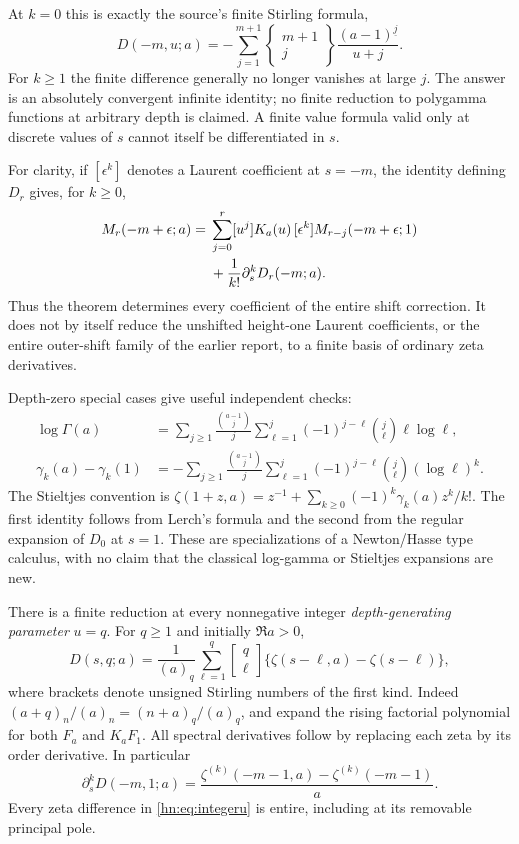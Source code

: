 \documentclass[11pt,a4paper]{article}
\numberwithin{equation}{section}
\theoremstyle{definition}
\theoremstyle{remark}
\begin{document}
At $k=0$ this is exactly the source's finite Stirling formula,
\[
 D(-m,u;a)=-\sum_{j=1}^{m+1}
       \left\{\begin{matrix}m+1\\j\end{matrix}\right\}
       \frac{(a-1)^{\underline j}}{u+j}.
\]
For $k\ge1$ the finite difference generally no longer vanishes at
large $j$. The answer is an absolutely convergent infinite identity;
no finite reduction to polygamma functions at arbitrary depth is
claimed. A finite value formula valid only at discrete values
of $s$ cannot itself be differentiated in $s$.

For clarity, if $[\epsilon^k]$ denotes a Laurent coefficient at
$s=-m$, the identity defining $D_r$ gives, for $k\ge0$,
\begin{align}
 [\epsilon^k]M_r(-m+\epsilon;a)
 ={}&\sum_{j=0}^r[u^j]K_a(u)\,
                 [\epsilon^k]M_{r-j}(-m+\epsilon;1)\notag\\
 &+\frac1{k!}\partial_s^kD_r(-m;a).
 \label{hn:eq:regular-reconstruction}
\end{align}
Thus the theorem determines every coefficient of the entire
shift correction. It does not by itself reduce the unshifted
height-one Laurent coefficients, or the entire outer-shift family
of the earlier report, to a finite basis of ordinary zeta derivatives.


Depth-zero special cases give useful independent checks:
\begin{align}
 \log\Gamma(a)
 &=\sum_{j\ge1}\frac{\binom{a-1}{j}}j
      \sum_{\ell=1}^j(-1)^{j-\ell}\binom j\ell\ell\log\ell,
 \label{hn:eq:loggamma}\\
 \gamma_k(a)-\gamma_k(1)
 &=-\sum_{j\ge1}\frac{\binom{a-1}{j}}j
      \sum_{\ell=1}^j(-1)^{j-\ell}\binom j\ell(\log\ell)^k.
 \label{hn:eq:Stieltjes-Newton}
\end{align}
The Stieltjes convention is
$\zeta(1+z,a)=z^{-1}+\sum_{k\ge0}(-1)^k\gamma_k(a)z^k/k!$.
The first identity follows from Lerch's formula \cite{DLMFHurwitz} and the second
from the regular expansion of $D_0$ at $s=1$. These are
specializations of a Newton/Hasse type calculus, with no claim
that the classical log-gamma or Stieltjes expansions are new.

There is a finite reduction at every nonnegative integer
\emph{depth-generating parameter} $u=q$. For $q\ge1$ and initially $\Re a>0$,
\begin{equation}\label{hn:eq:integeru}
 D(s,q;a)=\frac1{(a)_q}\sum_{\ell=1}^q
      \left[\begin{matrix}q\\\ell\end{matrix}\right]
            \{\zeta(s-\ell,a)-\zeta(s-\ell)\},
\end{equation}
where brackets denote unsigned Stirling numbers of the first kind.
Indeed $(a+q)_n/(a)_n=(n+a)_q/(a)_q$, and expand the rising
factorial polynomial for both $F_a$ and $K_aF_1$.
All spectral derivatives follow by replacing each zeta by its
order derivative. In particular
\[
 \partial_s^kD(-m,1;a)
   =\frac{\zeta^{(k)}(-m-1,a)-\zeta^{(k)}(-m-1)}a.
\]
Every zeta difference in \eqref{hn:eq:integeru} is entire,
including at its removable principal pole.
\end{document}
